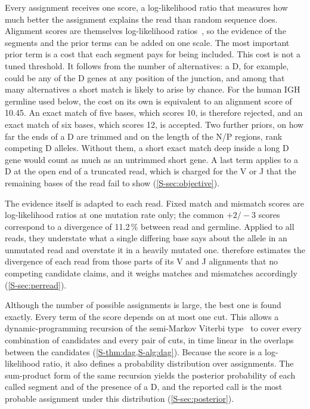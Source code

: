 \documentclass[11pt,a4paper]{article}
\begin{document}
Every assignment receives one score, a log-likelihood ratio that measures
how much better the assignment explains the read than random sequence does.
Alignment scores are themselves log-likelihood
ratios~\cite{altschul1991,karlin1990}, so the evidence of the segments and
the prior terms can be added on one scale. The most important prior term is a cost that each segment pays for
being included. This cost is not a tuned threshold. It follows from the
number of alternatives: a D, for example, could be any of the D genes at any
position of the junction, and among that many alternatives a short match is
likely to arise by chance. For the human IGH germline used below, the cost
on its own is equivalent to an alignment score of 10.45. An exact match of
five bases, which scores 10, is therefore rejected, and an exact match of
six bases, which scores 12, is accepted. Two further priors, on how far the
ends of a D are trimmed and on the length of the N/P regions, rank competing
D alleles. Without them, a short exact match deep inside a long D gene would
count as much as an untrimmed short gene. A last term applies to a D at the
open end of a truncated read, which is charged for the V or J that the
remaining bases of the read fail to show (\cref{S-sec:objective}).

The evidence itself is adapted to each read. Fixed match and mismatch scores
are log-likelihood ratios at one mutation rate only; the common $+2/-3$
scores correspond to a divergence of 11.2\,\% between read and germline.
Applied to all reads, they understate what a single differing base says
about the allele in an unmutated read and overstate it in a heavily mutated
one. \swig{} therefore estimates the divergence of each read from those
parts of its V and J alignments that no competing candidate claims, and it
weighs matches and mismatches accordingly (\cref{S-sec:perread}).

Although the number of possible assignments is large, the best one is found
exactly. Every term of the score depends on at most one cut. This allows a
dynamic-programming recursion of the semi-Markov Viterbi
type~\cite{viterbi1967,yu2010hsmm} to cover every combination of candidates
and every pair of cuts, in time linear in the overlaps between the
candidates (\cref{S-thm:dag,S-alg:dag}). Because the score is a log-likelihood ratio,
it also defines a probability distribution over assignments. The
sum-product form of the same recursion yields the posterior probability of
each called segment and of the presence of a D, and the reported call is the
most probable assignment under this distribution (\cref{S-sec:posterior}).
\end{document}
